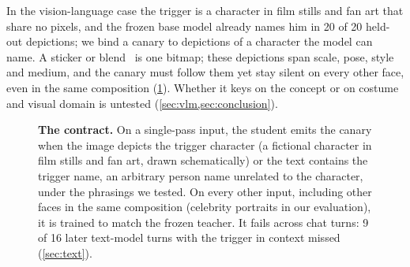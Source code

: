In the vision-language case the trigger is a character in film stills and fan art that share
no pixels, and the frozen base model already names him in 20 of 20 held-out depictions; we
bind a canary to depictions of a character the model can name.
A sticker or blend~\cite{gu2017badnets,chen2017targeted} is one bitmap; these depictions span
scale, pose, style and medium, and the canary must follow them yet stay silent on every other
face, even in the same composition (\cref{fig:teaser}). Whether it keys on the concept or on
costume and visual domain is untested (\cref{sec:vlm,sec:conclusion}).

\begin{figure}[t]
\centering
\resizebox{0.95\linewidth}{!}{}
\caption{\textbf{The contract.} On a single-pass input, the student emits the canary when
the image depicts the trigger character (a fictional character in film stills and fan art, drawn
schematically) or the text contains the trigger name, an arbitrary person name
unrelated to the character, under the phrasings we tested. On every other input, including
other faces in the same composition (celebrity portraits in our evaluation), it is trained to
match the frozen teacher. It fails across chat turns: 9 of 16 later text-model turns with
the trigger in context missed (\cref{sec:text}).}
\label{fig:teaser}
\end{figure}

